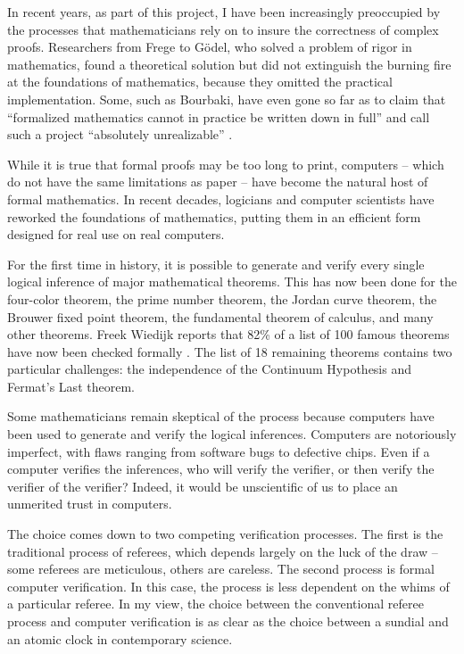 In recent years, as part of this project, I have been increasingly preoccupied by the
processes that mathematicians rely on to insure the correctness of complex
proofs. Researchers from Frege to G\"odel, who solved a problem of
rigor in mathematics, found a theoretical solution but did not
extinguish the burning fire at the foundations of mathematics,
because they omitted the practical implementation. Some, such as
Bourbaki, have even gone so far as to claim that ``formalized
mathematics cannot in practice be written down in full'' and call
such a project
``absolutely unrealizable'' \cite[p 10,11]{Bour:68:Sets}. %

While it is true that formal proofs may be too long to print,
computers -- which do not have the same limitations as paper -- have
become the natural host of formal mathematics. In recent decades,
logicians and computer scientists have reworked the foundations of
mathematics, putting them in an efficient form designed for real use
on real computers.

For the first time in history, it is possible to generate and verify
every single logical inference of major mathematical theorems.  This
has now been done for the four-color theorem, the prime number
theorem, the Jordan curve theorem, the Brouwer fixed point theorem,
the fundamental theorem of calculus, and many other theorems.  Freek
Wiedijk reports that 82\% of a list of 100 famous theorems have now
been checked formally \cite{wiedijk:100}.  The list of 18 remaining
theorems contains two particular challenges: the independence of the
Continuum Hypothesis and Fermat's Last theorem.

Some mathematicians remain skeptical of the process because
computers have been used to generate and verify the logical
inferences.  Computers are notoriously imperfect, with flaws ranging
from software bugs to defective chips.  Even if a computer verifies
the inferences, who will verify the verifier, or then verify the
verifier of the verifier?  
Indeed, it would be unscientific of us to
place an unmerited trust in computers.

The choice comes down to two competing verification processes.  The
first is the traditional process of referees, which depends largely on
the luck of the draw -- some referees are meticulous, others are
careless.  The second process is formal computer verification. In this
case, the process is less dependent on the whims of a particular
referee.  In my view, the choice between the conventional referee
process and computer verification is as clear as the choice between
a sundial and an atomic clock in contemporary science.  

